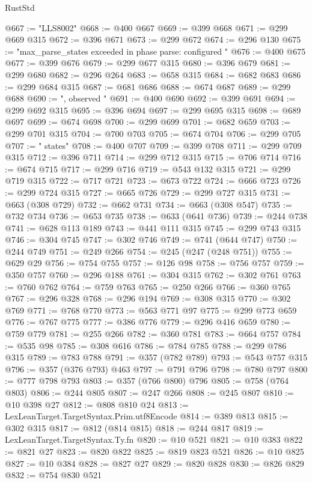\begin{lexlean}{RustStd}
\begin{coremodule}
@667 := "LLS8002"
@668 := @400 @667
@669 := @399 @668
@671 := @299 @669 @315
@672 := @396 @671
@673 := @299 @672
@674 := @296 @130
@675 := "max_parse_states exceeded in phase parse: configured "
@676 := @400 @675
@677 := @399 @676
@679 := @299 @677 @315
@680 := @396 @679
@681 := @299 @680
@682 := @296 @264
@683 := @658 @315
@684 := @682 @683
@686 := @299 @684 @315
@687 := @681 @686
@688 := @674 @687
@689 := @299 @688
@690 := ", observed "
@691 := @400 @690
@692 := @399 @691
@694 := @299 @692 @315
@695 := @396 @694
@697 := @299 @695 @315
@698 := @689 @697
@699 := @674 @698
@700 := @299 @699
@701 := @682 @659
@703 := @299 @701 @315
@704 := @700 @703
@705 := @674 @704
@706 := @299 @705
@707 := " states"
@708 := @400 @707
@709 := @399 @708
@711 := @299 @709 @315
@712 := @396 @711
@714 := @299 @712 @315
@715 := @706 @714
@716 := @674 @715
@717 := @299 @716
@719 := @543 @132 @315
@721 := @299 @719 @315
@722 := @717 @721
@723 := @673 @722
@724 := @666 @723
@726 := @299 @724 @315
@727 := @665 @726
@729 := @299 @727 @315
@731 := @663 (@308 @729)
@732 := @662 @731
@734 := @663 (@308 @547)
@735 := @732 @734
@736 := @653 @735
@738 := @633 (@641 @736)
@739 := @244 @738
@741 := @628 @113 @189
@743 := @441 @111 @315
@745 := @299 @743 @315
@746 := @304 @745
@747 := @302 @746
@749 := @741 (@644 @747)
@750 := @244 @749
@751 := @249 @266
@754 := @245 (@247 (@248 @751))
@755 := @629 @29
@756 := @754 @755
@757 := @126 @98
@758 := @756 @757
@759 := @350 @757
@760 := @296 @188
@761 := @304 @315
@762 := @302 @761
@763 := @760 @762
@764 := @759 @763
@765 := @250 @266
@766 := @360 @765
@767 := @296 @328
@768 := @296 @194
@769 := @308 @315
@770 := @302 @769
@771 := @768 @770
@773 := @563 @771 @97
@775 := @299 @773 @659
@776 := @767 @775
@777 := @386 @776
@779 := @296 @416 @659
@780 := @759 @779
@781 := @255 @266
@782 := @360 @781
@783 := @664 @757
@784 := @535 @98
@785 := @308 @616
@786 := @784 @785
@788 := @299 @786 @315
@789 := @783 @788
@791 := @357 (@782 @789)
@793 := @543 @757 @315
@796 := @357 (@376 @793) @463
@797 := @791 @796
@798 := @780 @797
@800 := @777 @798 @793
@803 := @357 (@766 @800) @796
@805 := @758 (@764 @803)
@806 := @244 @805
@807 := @247 @266
@808 := @245 @807
@810 := @10 @398 @27
@812 := @808 @810 @24
@813 := LexLeanTarget.TargetSyntax.Prim.utf8Encode
@814 := @389 @813
@815 := @302 @315
@817 := @812 (@814 @815)
@818 := @244 @817
@819 := LexLeanTarget.TargetSyntax.Ty.fn
@820 := @10 @521
@821 := @10 @383
@822 := @821 @27
@823 := @820 @822
@825 := @819 @823 @521
@826 := @10 @825
@827 := @10 @384
@828 := @827 @27
@829 := @820 @828
@830 := @826 @829
@832 := @754 @830 @521

\end{coremodule}
\end{lexlean}
